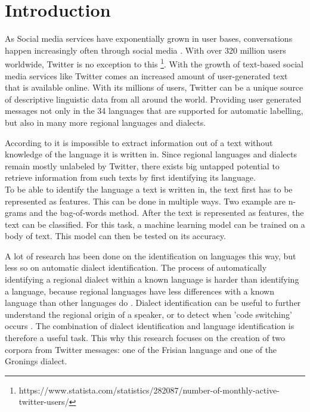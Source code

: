 \documentclass[
10pt, %
a4paper, %
oneside, %
headinclude,footinclude, %
] {book}%
\begin{document}
\chapter{Introduction}

As Social media services have exponentially grown in user bases, conversations happen increasingly often through social media \citep{globalization}.
With over 320 million users worldwide, Twitter is no exception to this \footnote{https://www.statista.com/statistics/282087/number-of-monthly-active-twitter-users/}. With the growth of text-based social media services like Twitter comes an increased amount of user-generated text that is available online. With its millions of users, Twitter can be a unique source of descriptive linguistic data from all around the world. Providing user generated messages not only in the 34 languages that are supported for automatic labelling, but also in many more regional languages and dialects.

According to \citet{ljub} it is impossible to extract information out of a text without knowledge of the language it is written in. Since regional languages and dialects remain mostly unlabeled by Twitter, there exists big untapped potential to retrieve information from such texts by first identifying its language. \\


To be able to identify the language a text is written in, the text first has to be represented as features. This can be done in multiple ways. Two example are n-grams and the bag-of-words method. After the text is represented as features, the text can be classified. For this task, a machine learning model can be trained on a body of text. This model can then be tested on its accuracy.

A lot of research has been done on the identification on languages this way, but less so on automatic dialect identification. The process of automatically identifying a regional dialect within a known language is harder than identifying a language, because regional languages have less differences with a known language than other languages do \citep{streektalen}. Dialect identification can be useful to further understand the regional origin of a speaker, or to detect when 'code switching' occurs \citep{Biadsy}. The combination of dialect identification and language identification is therefore a useful task. This why this research focuses on the creation of two corpora from Twitter messages: one of the Frisian language and one of the Gronings dialect.\\
\end{document}
